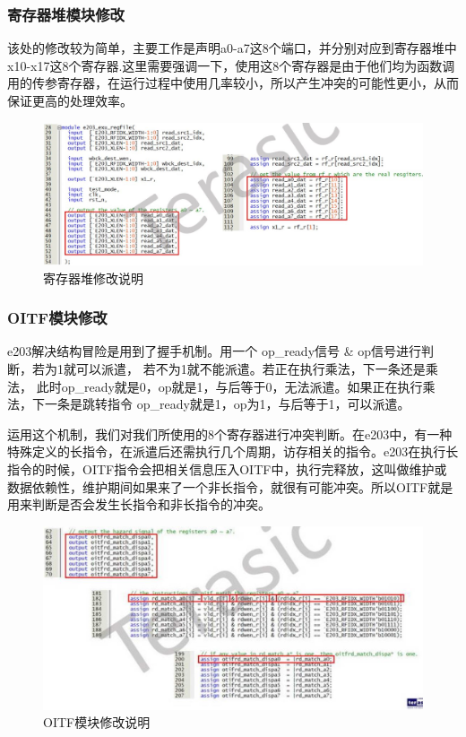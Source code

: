 \documentclass[a4paper, 14pt, oneside]{book} %
\numberwithin{equation}{subsection}
\begin{document}
	\subsubsection{寄存器堆模块修改}
	该处的修改较为简单，主要工作是声明a0-a7这8个端口，并分别对应到寄存器堆中x10-x17这8个寄存器.这里需要强调一下，使用这8个寄存器是由于他们均为函数调用的传参寄存器，在运行过程中使用几率较小，所以产生冲突的可能性更小，从而保证更高的处理效率。
	\begin{figure}[H]
		\centering
		\includegraphics[scale=0.6]{img/register.jpg}
		\caption{寄存器堆修改说明}
	\end{figure}

	\subsubsection{OITF模块修改}
	e203解决结构冒险是用到了握手机制。用一个 op\_ready信号 \& op信号进行判断，若为1就可以派遣， 若不为1就不能派遣。若正在执行乘法，下一条还是乘法， 此时op\_ready就是0，op就是1，与后等于0，无法派遣。如果正在执行乘法，下一条是跳转指令 op\_ready就是1，op为1，与后等于1，可以派遣。
	
	运用这个机制，我们对我们所使用的8个寄存器进行冲突判断。在e203中，有一种特殊定义的长指令，在派遣后还需执行几个周期，访存相关的指令。e203在执行长指令的时候，OITF指令会把相关信息压入OITF中，执行完释放，这叫做维护或数据依赖性，维护期间如果来了一个非长指令，就很有可能冲突。所以OITF就是用来判断是否会发生长指令和非长指令的冲突。
	\begin{figure}[H]
		\centering
		\includegraphics[scale=0.8]{img/OITF.jpg}
		\caption{OITF模块修改说明}
	\end{figure}
	
\end{document}
